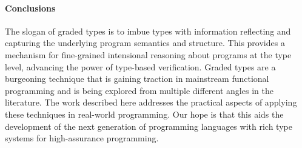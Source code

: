 \paragraph{Conclusions}
The slogan of graded types is to imbue types with
information reflecting and capturing the underlying program semantics
and structure. This provides a mechanism for fine-grained intensional
reasoning about programs at the type level, advancing the power of
type-based verification. Graded types are a burgeoning technique that is
gaining traction in mainstream functional programming and is being
explored from multiple different angles in the literature. The
work described here addresses the practical aspects of applying
these techniques in real-world programming. Our hope is that this
aids the development of the next generation of programming languages
with rich type systems for high-assurance programming.